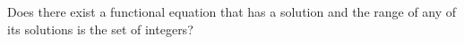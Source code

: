 Does there exist a functional equation that has a solution and the range of any of its solutions is the set of integers?

